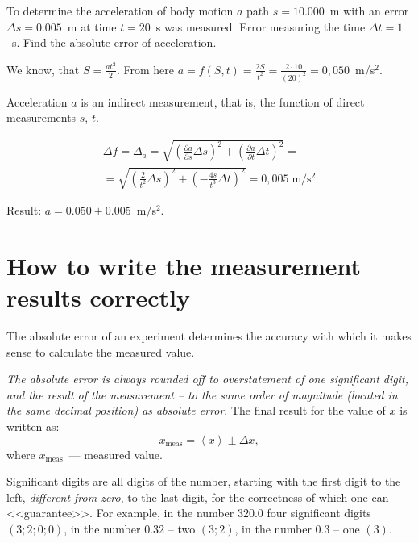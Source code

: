 \documentclass{LabWorkEng}
\begin{document}
\noindent%
\begin{Example}
	To determine the acceleration of  body motion $a$ path $s = 10.000$~m with an error $\Delta s = 0.005$~m at time $t = 20$~s was measured. Error measuring the time $\Delta t = 1$~s. Find the absolute error of acceleration.

	\hrulefill

	We know, that $S = \frac{at^2}{2}$. From here $a = f\left( {S,t} \right) = \frac{{2S}}{{{t^2}}} = \frac{{2 \cdot 10}}{{{\left( {20} \right)}^2}} = 0,050$~m/s$^2$.

	Acceleration $a$ is an indirect measurement, that is, the function of direct measurements $s$, $t$.

	\begin{multline*}
		\Delta f = {\Delta _a} = \sqrt{{{\left( {\frac{{\partial a}}{{\partial s}}\Delta s} \right)}^2} + {{\left( {\frac{{\partial a}}{{\partial t}}\Delta t} \right)}^2}}  = \\
		= \sqrt {{{\left( {\frac{2}{{{t^2}}}\Delta s} \right)}^2} + {{\left( { - \frac{{4s}}{{{t^3}}}\Delta t} \right)}^2}}
		= 0,005\;\text{m/{s$^2$}}
	\end{multline*}

	Result:  $a = 0.050\pm 0.005$~m/{s$^2$}.
\end{Example}

\section{How to write the measurement results correctly}
The absolute error of an experiment determines the accuracy with which it makes sense to calculate the measured value.

\textit{The absolute error is always rounded  off to overstatement of one significant digit, and the result of the measurement -- to the same order of magnitude (located in the same decimal position) as absolute error}. The final result for the value of $x$ is written as:  
\begin{equation*}
	x_\mathrm{meas} = \left\langle x \right\rangle  \pm \Delta x,
\end{equation*}
where $x_\mathrm{meas}$~--- measured value.

Significant digits are all digits of the number, starting with the first digit to the left, \textit{different from zero}, to the last digit, for the correctness of which one can <<guarantee>>. For example, in the number $320.0$ four significant digits $(3; 2; 0; 0)$, in the number $0.32$ -- two $(3; 2)$, in the number $0.3$ -- one $(3)$.
\end{document}
